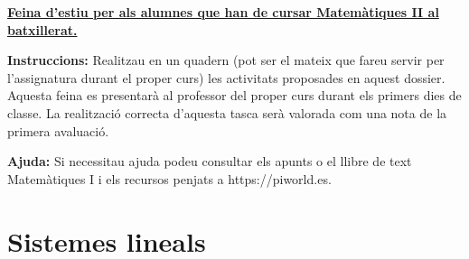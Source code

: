 \documentclass[11pt, a4paper, pdf]{article}
\begin{document}
\pagestyle{blocfancy}
\setcounter{myenumi}{0}
\begin{center}
	\large
	\textbf{\underline{
	Feina d'estiu per als alumnes que han de cursar Matemàtiques II al batxillerat.
	}
	}
\end{center}



\begin{blueshaded}
		\textbf{Instruccions: } Realitzau en un quadern (pot ser el mateix que fareu servir per l'assignatura durant el proper curs) les activitats proposades en aquest dossier. Aquesta feina es presentarà al professor del proper curs durant els primers dies de classe. La realització correcta d'aquesta tasca serà valorada com una nota de la primera avaluació.
		
		\textbf{Ajuda: } Si necessitau ajuda podeu consultar els apunts o el llibre de text Matemàtiques I i els recursos penjats a https://piworld.es. 
\end{blueshaded}

\section{Sistemes lineals}
\end{document}
